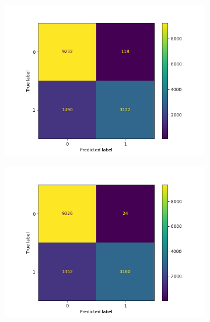 \begin{figure}
    \vspace{-1cm}
        \centering
        \hspace{-2cm}
        \begin{subfigure}[b]{0.245\textwidth}  
            \centering 
            \includegraphics[scale=0.35]{"../figs/fig_content_title/fig_ngram_2_LogisticRegression(solver='sag')__content_title.png"}
            \caption{}
        \end{subfigure}
        \begin{subfigure}[b]{0.245\textwidth}
            \centering
            \includegraphics[scale=0.35]{"../figs/fig_content_title/fig_ngram_3_LogisticRegression(max_iter=10000, n_jobs=-1, solver='saga')__content_title.png"}

\end{subfigure}
\end{figure}
